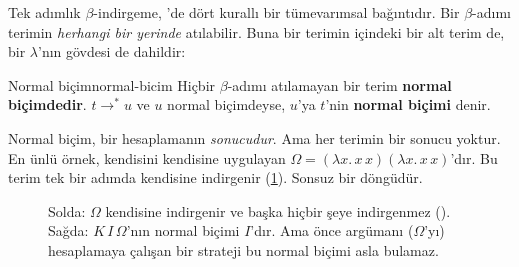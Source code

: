 Tek adımlık $\beta$-indirgeme, \Lean{}'de dört kurallı bir tümevarımsal
bağıntıdır. Bir $\beta$-adımı terimin \emph{herhangi bir yerinde}
atılabilir. Buna bir terimin içindeki bir alt terim de, bir $\lambda$'nın
gövdesi de dahildir:


\begin{tanim}{Normal biçim}{normal-bicim}
Hiçbir $\beta$-adımı atılamayan bir terim \textbf{normal biçimdedir}.
$t \to^* u$ ve $u$ normal biçimdeyse, $u$'ya $t$'nin \textbf{normal
biçimi} denir.
\end{tanim}


\noindent Normal biçim, bir hesaplamanın \emph{sonucudur}. Ama her terimin
bir sonucu yoktur. En ünlü örnek, kendisini kendisine uygulayan
$\Omega = (\lambda x.\, x\,x)(\lambda x.\, x\,x)$'dır. Bu terim tek bir
adımda kendisine indirgenir (\cref{fig:omega}). Sonsuz bir döngüdür.


\begin{figure}[htbp]
\centering
{}
\caption{Solda: $\Omega$ kendisine indirgenir ve başka hiçbir şeye
indirgenmez (). Sağda: $K\,I\,\Omega$'nın normal biçimi
$I$'dır. Ama önce argümanı ($\Omega$'yı) hesaplamaya çalışan bir strateji
bu normal biçimi asla bulamaz.}
\label{fig:omega}
\end{figure}

